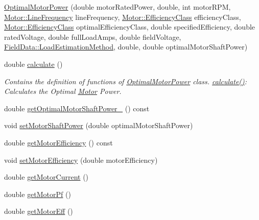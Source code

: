 \begin{DoxyCompactItemize}
\item 
\hyperlink{class_optimal_motor_power_a655953d8e84d386a6e5ea4044098dcc0}{Optimal\+Motor\+Power} (double motor\+Rated\+Power, double, int motor\+R\+PM, \hyperlink{class_motor_acee1bdf1b684ad36cb80dc2829d9fcee}{Motor\+::\+Line\+Frequency} line\+Frequency, \hyperlink{class_motor_afa022971ae062406a9f588c601673d4e}{Motor\+::\+Efficiency\+Class} efficiency\+Class, \hyperlink{class_motor_afa022971ae062406a9f588c601673d4e}{Motor\+::\+Efficiency\+Class} optimal\+Efficiency\+Class, double specified\+Efficiency, double rated\+Voltage, double full\+Load\+Amps, double field\+Voltage, \hyperlink{class_field_data_a424e89914ba5684c01bb269dbe3312fd}{Field\+Data\+::\+Load\+Estimation\+Method}, double, double optimal\+Motor\+Shaft\+Power)
\item 
double \hyperlink{class_optimal_motor_power_a8db12b796c148e0130b261ae138057bf}{calculate} ()
\begin{DoxyCompactList}\small\item\em Contains the definition of functions of \hyperlink{class_optimal_motor_power}{Optimal\+Motor\+Power} class. \hyperlink{class_optimal_motor_power_a8db12b796c148e0130b261ae138057bf}{calculate()}\+: Calculates the Optimal \hyperlink{class_motor}{Motor} Power. \end{DoxyCompactList}\item 
double \hyperlink{class_optimal_motor_power_af902365015880d5f11d865465672d7bb}{get\+Optimal\+Motor\+Shaft\+Power\+\_\+} () const
\item 
void \hyperlink{class_optimal_motor_power_ada8a9e3caac34c54470ad13ffe7edf53}{set\+Motor\+Shaft\+Power} (double optimal\+Motor\+Shaft\+Power)
\item 
double \hyperlink{class_optimal_motor_power_a10b3528bec621cab146608c6326526e3}{get\+Motor\+Efficiency} () const
\item 
void \hyperlink{class_optimal_motor_power_a297acce2fcd06a57108fb52058a61cac}{set\+Motor\+Efficiency} (double motor\+Efficiency)
\item 
double \hyperlink{class_optimal_motor_power_a2c058c4320a840018a420e10272cc4dd}{get\+Motor\+Current} ()
\item 
double \hyperlink{class_optimal_motor_power_a94d4c8a84c1bd19b799e35b966368f5a}{get\+Motor\+Pf} ()
\item 
double \hyperlink{class_optimal_motor_power_a341fe7520227f27f9cce23f3dc4cb0cb}{get\+Motor\+Eff} ()
\item 

\end{DoxyCompactItemize}
